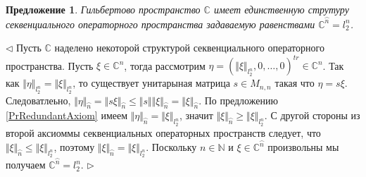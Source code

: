 \documentclass[12pt]{article}
\newtheorem{proposition}[theorem]{Предложение}
\newenvironment{proof}{\par $\triangleleft$}{$\triangleright$}
\begin{document}
\begin{proposition}\label{PrCHaveUniqueOSS} Гильбертово пространство $\mathbb{C}$ имеет единственную струтуру секвенциального операторного пространства задаваемую равенствами $\mathbb{C}^{\wideparen{n}}=l_2^n$.
\end{proposition}
\begin{proof} Пусть $\mathbb{C}$ наделено некоторой структурой секвенциального операторного пространства. Пусть $\xi\in\mathbb{C}^n$, тогда рассмотрим $\eta=(\Vert \xi\Vert_{l_2^n},0,\ldots,0)^{tr}\in \mathbb{C}^n$. Так как $\Vert\eta\Vert_{l_2^n}=\Vert\xi\Vert_{l_2^n}$, то существует унитарыная матрица $s\in M_{n,n}$ такая что $\eta=s\xi$. Следоватлеьно, $\Vert\eta\Vert_{\wideparen{n}}=\Vert s\xi\Vert_{\wideparen{n}}\leq\Vert s\Vert\Vert\xi\Vert_{\wideparen{n}}=\Vert\xi\Vert_{\wideparen{n}}$. По предложению \ref{PrRedundantAxiom} имеем $\Vert\eta\Vert_{\wideparen{n}}=\Vert \xi\Vert_{l_2^n}$, значит $\Vert\xi\Vert_{\wideparen{n}}\geq\Vert\xi\Vert_{l_2^n}$. С другой  стороны из второй аксиоммы секвенциальных операторных пространств следует, что $\Vert \xi\Vert_{\wideparen{n}}\leq\Vert\xi\Vert_{l_2^n}$, поэтому $\Vert \xi\Vert_{\wideparen{n}}=\Vert \xi\Vert_{l_2^n}$. Поскольку $n\in\mathbb{N}$ и $\xi\in \mathbb{C}^{\wideparen{n}}$ произвольны мы получаем $\mathbb{C}^{\wideparen{n}}=l_2^n$.
\end{proof}
\end{document}
